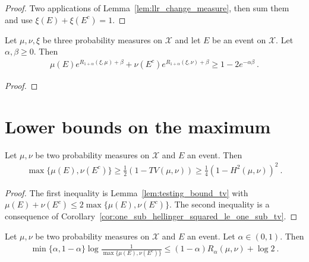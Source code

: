 \begin{proof}
Two applications of Lemma~\ref{lem:llr_change_measure}, then sum them and use $\xi(E)+\xi(E^c) = 1$.
\end{proof}

\begin{lemma}
  \label{lem:renyi_change_measure_add}
  Let $\mu, \nu, \xi$ be three probability measures on $\mathcal X$ and let $E$ be an event on $\mathcal X$. Let $\alpha, \beta \ge 0$. Then
  \begin{align*}
  \mu(E) e^{R_{1+\alpha}(\xi, \mu) + \beta} + \nu(E^c) e^{R_{1+\alpha}(\xi, \nu) + \beta} \ge 1 - 2 e^{-\alpha \beta} \: .
  \end{align*}
\end{lemma}

\begin{proof}
\end{proof}


\section{Lower bounds on the maximum}

\begin{lemma}
  \label{lem:testing_bound_tv_hellinger_max}
  Let $\mu, \nu$ be two probability measures on $\mathcal X$ and $E$ an event. Then
  \begin{align*}
  \max\{\mu(E), \nu(E^c)\}
  \ge \frac{1}{2}(1 - TV(\mu, \nu))
  \ge \frac{1}{4}(1 - H^2(\mu, \nu))^2
  \: .
  \end{align*}
\end{lemma}

\begin{proof}
The first inequality is Lemma~\ref{lem:testing_bound_tv} with $\mu(E) + \nu(E^c) \le 2 \max\{\mu(E), \nu(E^c)\}$.
The second inequality is a consequence of Corollary~\ref{cor:one_sub_hellinger_squared_le_one_sub_tv}.
\end{proof}

\begin{lemma}
  \label{lem:testing_bound_renyi_max}
  Let $\mu, \nu$ be two probability measures on $\mathcal X$ and $E$ an event. Let $\alpha \in (0,1)$. Then
  \begin{align*}
  \min\{\alpha, 1 - \alpha\} \log\frac{1}{\max\{\mu(E), \nu(E^c)\}} \le (1 - \alpha) R_{\alpha}(\mu, \nu)  + \log 2 \: .
  \end{align*}
\end{lemma}

